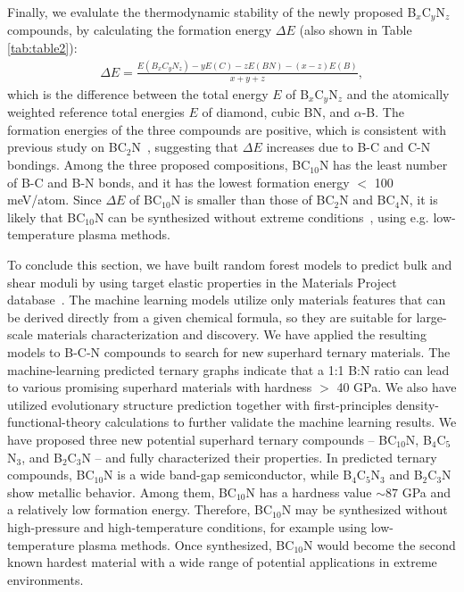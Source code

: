 	Finally, we evalulate the thermodynamic stability of the newly proposed B$_x$C$_y$N$_z$ compounds, by calculating the formation energy $\Delta E$ (also shown in Table \ref{tab:table2}):
	\begin{equation}
		\label{eq:5}
		\begin{aligned}
			\Delta E = \frac{E(B_xC_yN_z)-yE(C) - zE(BN) - (x-z)E(B)}{x+y+z},
		\end{aligned}
	\end{equation}
	which is the difference between the total energy $E$ of B$_x$C$_y$N$_z$ and the atomically weighted reference total energies $E$ of diamond, cubic BN, and $\alpha$-B. The formation energies of the three compounds are positive, which is consistent with previous study on BC$_2$N~\cite{PhysRevLett.98.015502}, suggesting that $\Delta E$ increases due to B-C and C-N bondings.
	Among the three proposed compositions, BC$_{10}$N has the least number of B-C and B-N bonds, and it has the lowest formation energy $<$ 100 meV/atom. Since $\Delta E$ of BC$_{10}$N is smaller than those of BC$_{2}$N and BC$_{4}$N, it is likely that BC$_{10}$N can be synthesized without extreme conditions~\cite{aykol2018thermodynamic}, using e.g. low-temperature plasma methods.
	
	To conclude this section, we have built random forest models to predict bulk and shear moduli by using target elastic properties in the Materials Project database~\cite{MP}.
	The machine learning models utilize only materials features that can be derived directly from a given chemical formula, so they are suitable for large-scale materials characterization and discovery. We have applied the resulting models to B-C-N compounds to search for new superhard ternary materials.
	The machine-learning predicted ternary graphs indicate that a 1:1 B:N ratio can lead to various promising superhard materials with hardness $>$ 40 GPa.
	We also have utilized evolutionary structure prediction together with first-principles density-functional-theory calculations to further validate the machine learning results.
	We have proposed three new potential superhard ternary compounds -- BC$_{10}$N, B$_4$C$_5$N$_3$, and B$_2$C$_3$N -- and fully characterized their properties. 
	In predicted ternary compounds, BC$_{10}$N is a wide band-gap semiconductor, while B$_4$C$_5$N$_3$ and B$_2$C$_3$N show metallic behavior. 
	Among them, BC$_{10}$N has a hardness value $\sim 87$ GPa and a relatively low formation energy. Therefore, BC$_{10}$N may be synthesized without high-pressure and high-temperature conditions, for example using low-temperature plasma methods.
	Once synthesized, BC$_{10}$N would become the second known hardest material with a wide range of potential applications in extreme environments.
	
